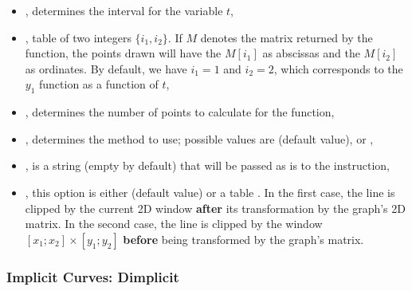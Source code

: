 \begin{itemize}
\begin{itemize}
    \begin{itemize}
        \item {}, determines the interval for the variable $t$,
        \item {}, table of two integers $\{i_1,i_2\}$. If $M$ denotes the matrix returned by the  function, the points drawn will have the $M[i_1]$ as abscissas and the $M[i_2]$ as ordinates. By default, we have $i_1=1$ and $i_2=2$, which corresponds to the $y_1$ function as a function of $t$,
        \item {}, determines the number of points to calculate for the function,
        \item {}, determines the method to use; possible values ​​are  (default value), or ,
        \item {}, is a string (empty by default) that will be passed as is to the \drawcmd instruction,
        \item {}, this option is either \nil (default value) or a table . In the first case, the line is clipped by the current 2D window \textbf{after} its transformation by the graph's 2D matrix. In the second case, the line is clipped by the window $[x_1;x_2]\times[y_1;y_2]$ \textbf{before} being transformed by the graph's matrix.
    \end{itemize}
\end{itemize}
\end{itemize}

\subsubsection{Implicit Curves: Dimplicit}

